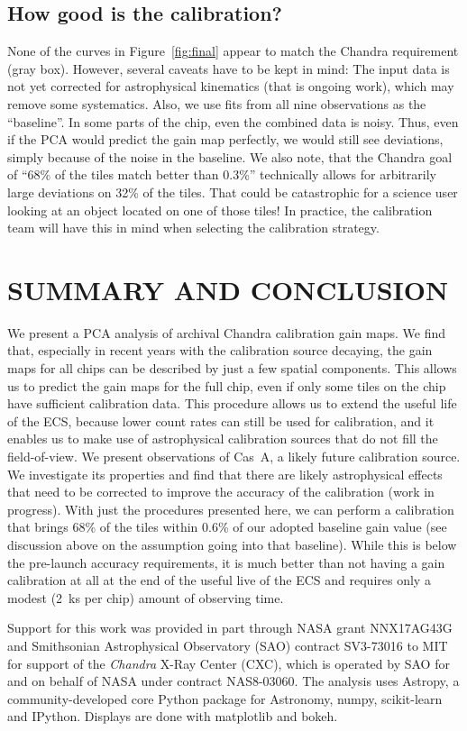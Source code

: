 \documentclass[]{spie}  %
\begin{document}
\subsection{How good is the calibration?}
None of the curves in Figure~\ref{fig:final} appear to match the Chandra requirement (gray box). However, several caveats have to be kept in mind: The input data is not yet corrected for astrophysical kinematics (that is ongoing work), which may remove some systematics. Also, we use fits from all nine observations as the ``baseline''. In some parts of the chip, even the combined data is noisy. Thus, even if the PCA would predict the gain map perfectly, we would still see deviations, simply because of the noise in the baseline. We also note, that the Chandra goal of ``68\% of the tiles match better than 0.3\%'' technically allows for arbitrarily large deviations on 32\% of the tiles. That could be catastrophic for a science user looking at an object located on one of those tiles! In practice, the calibration team will have this in mind when selecting the calibration strategy.

\section{SUMMARY AND CONCLUSION}
We present a PCA analysis of archival Chandra calibration gain maps. We find that, especially in recent years with the calibration source decaying, the gain maps for all chips can be described by just a few spatial components. This allows us to predict the gain maps for the full chip, even if only some tiles on the chip have sufficient calibration data. This procedure allows us to extend the useful life of the ECS, because lower count rates can still be used for calibration, and it enables us to make use of astrophysical calibration sources that do not fill the field-of-view. We present observations of Cas~A, a likely future calibration source. We investigate its properties and find that there are likely astrophysical effects that need to be corrected to improve the accuracy of the calibration (work in progress). With just the procedures presented here, we can perform a calibration that brings 68\% of the tiles within 0.6\% of our adopted baseline gain value (see discussion above on the assumption going into that baseline). While this is below the pre-launch accuracy requirements, it is much better than not having a gain calibration at all at the end of the useful live of the ECS and requires only a modest (2~ks per chip) amount of observing time.

\acknowledgments
Support
for this work was provided in part through NASA grant NNX17AG43G and
Smithsonian Astrophysical Observatory (SAO) contract SV3-73016 to MIT
for support of the {\em Chandra} X-Ray Center (CXC), which is operated
by SAO for and on behalf of NASA under contract NAS8-03060.
The
analysis uses Astropy, a community-developed core Python
package for Astronomy\cite{astropy1,astropy2}, numpy\cite{numpy}, scikit-learn\cite{scikit-learn} and
IPython\cite{IPython}. Displays are done with
matplotlib\cite{matplotlib} and bokeh\cite{bokeh}.

\end{document}
